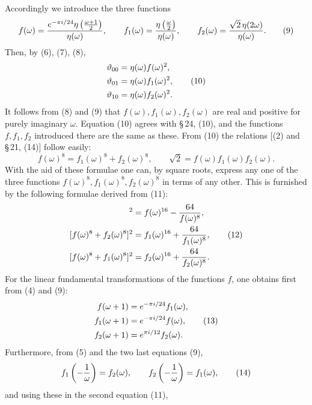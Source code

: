 \documentclass[11pt]{article}
\providecommand{\tht}{\vartheta}
\begin{document}
Accordingly we introduce the three functions
\begin{equation}
 f(\omega)={e^{-\pi i/24}\eta\left({\omega+1\over2}\right)\over\eta(\omega)},
\qquad
 f_1(\omega)={\eta\left({\omega\over2}\right)\over\eta(\omega)},
\qquad
 f_2(\omega)={\sqrt2\,\eta(2\omega)\over\eta(\omega)}. \tag{9}
\end{equation}
Then, by (6), (7), (8),
\begin{align}
\tht_{00}&=\eta(\omega)f(\omega)^2,\notag\\
\tht_{01}&=\eta(\omega)f_1(\omega)^2, \tag{10}\\
\tht_{10}&=\eta(\omega)f_2(\omega)^2.\notag
\end{align}
It follows from (8) and (9) that $f(\omega), f_1(\omega), f_2(\omega)$ are real and positive for purely imaginary $\omega$. Equation (10) agrees with \S\,24, (10), and the functions $f,f_1,f_2$ introduced there are the same as these. From (10) the relations [(2) and \S\,21, (14)] follow easily:
\begin{equation}
f(\omega)^8=f_1(\omega)^8+f_2(\omega)^8,
\qquad
\sqrt2=f(\omega)f_1(\omega)f_2(\omega). \tag{11}
\end{equation}
With the aid of these formulae one can, by square roots, express any one of the three functions $f(\omega)^8, f_1(\omega)^8, f_2(\omega)^8$ in terms of any other. This is furnished by the following formulae derived from (11):
\begin{align}
[f_1(\omega)^8-f_2(\omega)^8]^2&=f(\omega)^{16}-{64\over f(\omega)^8},\notag\\
[f(\omega)^8+f_2(\omega)^8]^2&=f_1(\omega)^{16}+{64\over f_1(\omega)^8}, \tag{12}\\
[f(\omega)^8+f_1(\omega)^8]^2&=f_2(\omega)^{16}+{64\over f_2(\omega)^8}.\notag
\end{align}
For the linear fundamental transformations of the functions $f$, one obtains first from (4) and (9):
\begin{align}
f(\omega+1)&=e^{-\pi i/24}f_1(\omega),\notag\\
f_1(\omega+1)&=e^{-\pi i/24}f(\omega), \tag{13}\\
f_2(\omega+1)&=e^{\pi i/12}f_2(\omega).\notag
\end{align}
Furthermore, from (5) and the two last equations (9),
\begin{equation}
f_1\left(-{1\over\omega}\right)=f_2(\omega),
\qquad
f_2\left(-{1\over\omega}\right)=f_1(\omega), \tag{14}
\end{equation}
and using these in the second equation (11),
\end{document}
